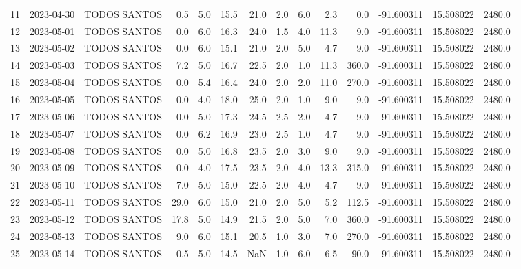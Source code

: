 \documentclass[12pt]{article}
\begin{document}
\begin{center}
\begin{tabular}{lllrrrrrrrrrrr}
11  & 2023-04-30 &  TODOS SANTOS &     0.5 &   5.0 &   15.5 &  21.0 &        2.0 &  6.0 &         2.3 &         0.0 & -91.600311 &  15.508022 &   2480.0 \\
12  & 2023-05-01 &  TODOS SANTOS &     0.0 &   6.0 &   16.3 &  24.0 &        1.5 &  4.0 &        11.3 &         9.0 & -91.600311 &  15.508022 &   2480.0 \\
13  & 2023-05-02 &  TODOS SANTOS &     0.0 &   6.0 &   15.1 &  21.0 &        2.0 &  5.0 &         4.7 &         9.0 & -91.600311 &  15.508022 &   2480.0 \\
14  & 2023-05-03 &  TODOS SANTOS &     7.2 &   5.0 &   16.7 &  22.5 &        2.0 &  1.0 &        11.3 &       360.0 & -91.600311 &  15.508022 &   2480.0 \\
15  & 2023-05-04 &  TODOS SANTOS &     0.0 &   5.4 &   16.4 &  24.0 &        2.0 &  2.0 &        11.0 &       270.0 & -91.600311 &  15.508022 &   2480.0 \\
16  & 2023-05-05 &  TODOS SANTOS &     0.0 &   4.0 &   18.0 &  25.0 &        2.0 &  1.0 &         9.0 &         9.0 & -91.600311 &  15.508022 &   2480.0 \\
17  & 2023-05-06 &  TODOS SANTOS &     0.0 &   5.0 &   17.3 &  24.5 &        2.5 &  2.0 &         4.7 &         9.0 & -91.600311 &  15.508022 &   2480.0 \\
18  & 2023-05-07 &  TODOS SANTOS &     0.0 &   6.2 &   16.9 &  23.0 &        2.5 &  1.0 &         4.7 &         9.0 & -91.600311 &  15.508022 &   2480.0 \\
19  & 2023-05-08 &  TODOS SANTOS &     0.0 &   5.0 &   16.8 &  23.5 &        2.0 &  3.0 &         9.0 &         9.0 & -91.600311 &  15.508022 &   2480.0 \\
20  & 2023-05-09 &  TODOS SANTOS &     0.0 &   4.0 &   17.5 &  23.5 &        2.0 &  4.0 &        13.3 &       315.0 & -91.600311 &  15.508022 &   2480.0 \\
21  & 2023-05-10 &  TODOS SANTOS &     7.0 &   5.0 &   15.0 &  22.5 &        2.0 &  4.0 &         4.7 &         9.0 & -91.600311 &  15.508022 &   2480.0 \\
22  & 2023-05-11 &  TODOS SANTOS &    29.0 &   6.0 &   15.0 &  21.0 &        2.0 &  5.0 &         5.2 &       112.5 & -91.600311 &  15.508022 &   2480.0 \\
23  & 2023-05-12 &  TODOS SANTOS &    17.8 &   5.0 &   14.9 &  21.5 &        2.0 &  5.0 &         7.0 &       360.0 & -91.600311 &  15.508022 &   2480.0 \\
24  & 2023-05-13 &  TODOS SANTOS &     9.0 &   6.0 &   15.1 &  20.5 &        1.0 &  3.0 &         7.0 &       270.0 & -91.600311 &  15.508022 &   2480.0 \\
25  & 2023-05-14 &  TODOS SANTOS &     0.5 &   5.0 &   14.5 &   NaN &        1.0 &  6.0 &         6.5 &        90.0 & -91.600311 &  15.508022 &   2480.0 \\
\bottomrule
\end{tabular}

        
        \end{center}
        
\end{document}
